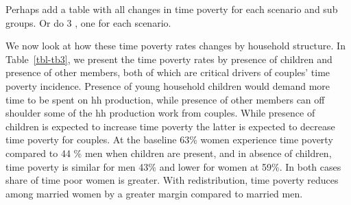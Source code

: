 \documentclass[
  11pt,
]{article}
\begin{document}
\begin{table}

\caption{\label{tbl-tb2}Time Poverty and Transition Rates}


\end{table}%

Perhaps add a table with all changes in time poverty for each scenario
and sub groups. Or do 3 , one for each scenario.

We now look at how these time poverty rates changes by household
structure. In Table~\ref{tbl-tb3}, we present the time poverty rates by
presence of children and presence of other members, both of which are
critical drivers of couples' time poverty incidence. Presence of young
household children would demand more time to be spent on hh production,
while presence of other members can off shoulder some of the hh
production work from couples. While presence of children is expected to
increase time poverty the latter is expected to decrease time poverty
for couples. At the baseline 63\% women experience time poverty compared
to 44 \% men when children are present, and in absence of children, time
poverty is similar for men 43\% and lower for women at 59\%. In both
cases share of time poor women is greater. With redistribution, time
poverty reduces among married women by a greater margin compared to
married men.
\end{document}
